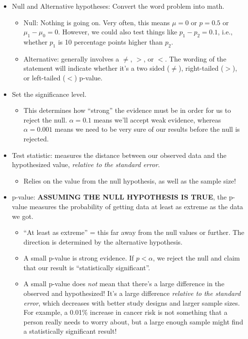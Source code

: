 \documentclass[
  letterpaper,
  DIV=11,
  numbers=noendperiod,
  oneside]{scrreprt}
\providecommand{\tightlist}{%
  \setlength{\itemsep}{0pt}\setlength{\parskip}{0pt}}\usepackage{longtable,booktabs,array}
\begin{document}
\begin{itemize}
\tightlist
\item
  Null and Alternative hypotheses: Convert the word problem into math.

  \begin{itemize}
  \tightlist
  \item
    Null: Nothing is going on. Very often, this means \(\mu = 0\) or
    \(p = 0.5\) or \(\mu_1 - \mu_0 = 0\). However, we could also test
    things like \(p_1 - p_2 = 0.1\), i.e., whether \(p_1\) is 10
    percentage points higher than \(p_2\).
  \item
    Alternative: generally involves a \(\ne\), \(>\), or \(<\). The
    wording of the statement will indicate whether it's a two sided
    (\(\ne\)), right-tailed (\(>\)), or left-tailed (\(<\)) p-value.
  \end{itemize}
\item
  Set the significance level.

  \begin{itemize}
  \tightlist
  \item
    This determines how ``strong'' the evidence must be in order for us
    to reject the null. \(\alpha = 0.1\) means we'll accept weak
    evidence, whereas \(\alpha = 0.001\) means we need to be very sure
    of our results before the null is rejected.
  \end{itemize}
\item
  Test statistic: measures the distance between our observed data and
  the hypothesized value, \emph{relative to the standard error}.

  \begin{itemize}
  \tightlist
  \item
    Relies on the value from the null hypothesis, as well as the sample
    size!
  \end{itemize}
\item
  p-value: \textbf{ASSUMING THE NULL HYPOTHESIS IS TRUE}, the p-value
  measures the probability of getting data at least as extreme as the
  data we got.

  \begin{itemize}
  \tightlist
  \item
    ``At least as extreme'' = this far away from the null values or
    further. The direction is determined by the alternative hypothesis.
  \item
    A small p-value is strong evidence. If \(p < \alpha\), we reject the
    null and claim that our result is ``statistically significant''.
  \item
    A small p-value does \emph{not} mean that there's a large difference
    in the observed and hypothesized! It's a large difference
    \emph{relative to the standard error}, which decreases with better
    study designs and larger sample sizes. For example, a 0.01\%
    increase in cancer risk is not something that a person really needs
    to worry about, but a large enough sample might find a statistically
    significant result!
  \end{itemize}
\end{itemize}
\end{document}
